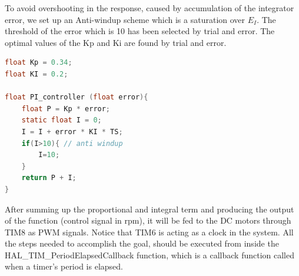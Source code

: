 \documentclass[english]{article}
\begin{document}
To avoid overshooting in the response, caused by accumulation of the 
integrator error, we set up an Anti-windup scheme which is a saturation over
$E_I$. The threshold of the error which is 10 has been selected by trial and error.
The optimal values of the Kp and Ki are found by trial and error. 
\begin{lstlisting}[language=C, caption={PI Controller}, label={lst:PI} ]
float Kp = 0.34;
float KI = 0.2;

float PI_controller (float error){
    float P = Kp * error;
    static float I = 0;
    I = I + error * KI * TS;
    if(I>10){ // anti windup
        I=10;
    }
    return P + I;
}    
\end{lstlisting}
After summing up the proportional and integral term and producing the output
 of the function (control signal in rpm), it will be fed to the DC motors
  through TIM8 as PWM signals. Notice that TIM6 is acting as a clock in the
   system. All the steps needed to accomplish the goal, should be executed 
   from inside the HAL\_TIM\_PeriodElapsedCallback function, which is a callback
    function called when a timer’s period is elapsed. 
\end{document}

